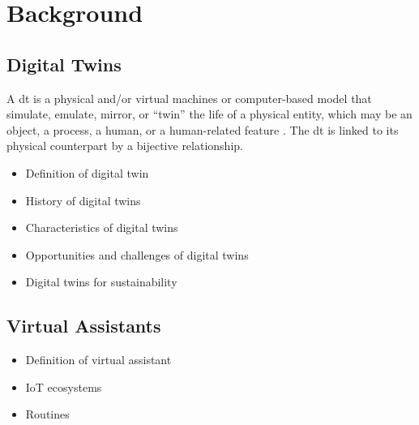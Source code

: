 \chapter{Background}\label{ch:background}

\section{Digital Twins}

A \acrfull{dt} is a physical and/or virtual machines or computer-based model that simulate, emulate, mirror, or ``twin'' the life of a physical entity, which may be an object, a process, a human, or a human-related feature \parencite{barricelli_multi-modal_2022}. The \acrshort{dt} is linked to its physical counterpart by a bijective relationship.

\begin{itemize}
    \item Definition of digital twin
    \item History of digital twins
    \item Characteristics of digital twins
    \item Opportunities and challenges of digital twins
    \item Digital twins for sustainability
\end{itemize}

\section{Virtual Assistants}

\begin{itemize}
    \item Definition of virtual assistant
    \item IoT ecosystems
    \item Routines
\end{itemize}